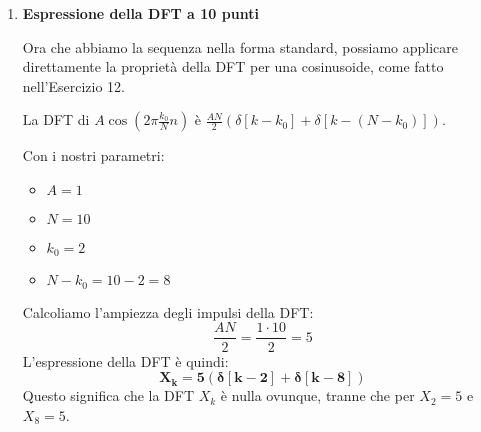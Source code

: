 \begin{soluzione}{15}
\begin{enumerate}
        \item \textbf{Espressione della DFT a 10 punti}
        
        Ora che abbiamo la sequenza nella forma standard, possiamo applicare direttamente la proprietà della DFT per una cosinusoide, come fatto nell'Esercizio 12.
        
        La DFT di $A\cos(2\pi \frac{k_0}{N}n)$ è $\frac{AN}{2}(\delta[k-k_0] + \delta[k-(N-k_0)])$.
        
        Con i nostri parametri:
        \begin{itemize}
            \item $A=1$
            \item $N=10$
            \item $k_0=2$
            \item $N-k_0 = 10-2 = 8$
        \end{itemize}
        Calcoliamo l'ampiezza degli impulsi della DFT:
        \[
            \frac{AN}{2} = \frac{1 \cdot 10}{2} = 5
        \]
        L'espressione della DFT è quindi:
        \[
            \mathbf{X_k = 5 \left( \delta[k - 2] + \delta[k - 8] \right)}
        \]
        Questo significa che la DFT $X_k$ è nulla ovunque, tranne che per $X_2 = 5$ e $X_8 = 5$.
    \end{enumerate}
\end{soluzione}